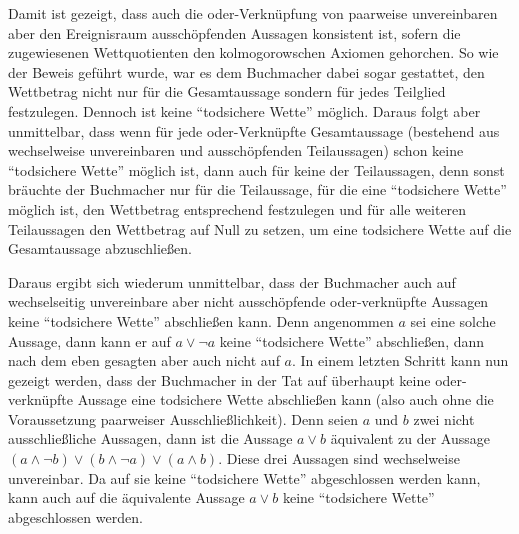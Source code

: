 Damit ist gezeigt, dass auch die oder-Verknüpfung von paarweise unvereinbaren
aber den Ereignisraum ausschöpfenden Aussagen konsistent ist, sofern die
zugewiesenen Wettquotienten den kolmogorowschen Axiomen gehorchen. So wie der
Beweis geführt wurde, war es dem Buchmacher dabei sogar gestattet, den
Wettbetrag nicht nur für die Gesamtaussage sondern für jedes Teilglied
festzulegen. Dennoch ist keine "`todsichere Wette"' möglich. Daraus folgt aber
unmittelbar, dass wenn für jede oder-Verknüpfte Gesamtaussage (bestehend aus
wechselweise unvereinbaren und ausschöpfenden Teilaussagen) schon keine
"`todsichere Wette"' möglich ist, dann auch für keine der Teilaussagen, denn
sonst bräuchte der Buchmacher nur für die Teilaussage, für die eine
"`todsichere Wette"' möglich ist, den Wettbetrag entsprechend festzulegen und
für alle weiteren Teilaussagen den Wettbetrag auf Null zu setzen, um eine
todsichere Wette auf die Gesamtaussage abzuschließen.

Daraus ergibt sich wiederum unmittelbar, dass der Buchmacher auch auf
wechselseitig unvereinbare aber nicht ausschöpfende oder-verknüpfte Aussagen
keine "`todsichere Wette"' abschließen kann. Denn angenommen $a$ sei eine
solche Aussage, dann kann er auf $a \vee \neg a$ keine "`todsichere Wette"'
abschließen, dann nach dem eben gesagten aber auch nicht auf $a$. 
In einem letzten Schritt kann nun gezeigt werden, dass der Buchmacher in der
Tat auf überhaupt keine oder-verknüpfte Aussage eine todsichere Wette
abschließen kann (also auch ohne die Voraussetzung paarweiser
Ausschließlichkeit). Denn seien $a$ und $b$ zwei nicht ausschließliche
Aussagen, dann ist die Aussage $a \vee b$ äquivalent zu der Aussage $(a \wedge
\neg b) \vee (b \wedge \neg a) \vee (a \wedge b)$. Diese drei Aussagen sind
wechselweise unvereinbar. Da auf sie keine "`todsichere Wette"' abgeschlossen
werden kann, kann auch auf die äquivalente Aussage $a \vee b$ keine
"`todsichere Wette"' abgeschlossen werden.

